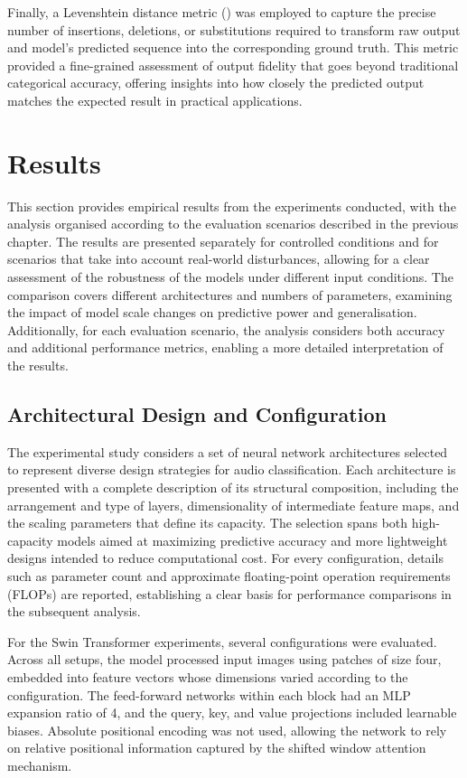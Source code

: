 \documentclass[a4paper,11pt,twoside]{report}
\theoremstyle{definition}
\begin{document}
Finally, a Levenshtein distance metric (\cite{levenshtein}) was employed to capture the precise number of insertions, deletions, or substitutions required to transform raw output and model's predicted sequence into the corresponding ground truth. This metric provided a fine-grained assessment of output fidelity that goes beyond traditional categorical accuracy, offering insights into how closely the predicted output matches the expected result in practical applications.


\chapter{Results}

This section provides empirical results from the experiments conducted, with the analysis organised according to the evaluation scenarios described in the previous chapter. The results are presented separately for controlled conditions and for scenarios that take into account real-world disturbances, allowing for a clear assessment of the robustness of the models under different input conditions. The comparison covers different architectures and numbers of parameters, examining the impact of model scale changes on predictive power and generalisation. Additionally, for each evaluation scenario, the analysis considers both accuracy and additional performance metrics, enabling a more detailed interpretation of the results.

\section{Architectural Design and Configuration}

The experimental study considers a set of neural network architectures selected to represent diverse design strategies for audio classification. Each architecture is presented with a complete description of its structural composition, including the arrangement and type of layers, dimensionality of intermediate feature maps, and the scaling parameters that define its capacity. The selection spans both high-capacity models aimed at maximizing predictive accuracy and more lightweight designs intended to reduce computational cost. For every configuration, details such as parameter count and approximate floating-point operation requirements (FLOPs) are reported, establishing a clear basis for performance comparisons in the subsequent analysis.

For the Swin Transformer experiments, several configurations were evaluated. Across all setups, the model processed input images using patches of size four, embedded into feature vectors whose dimensions varied according to the configuration. The feed-forward networks within each block had an MLP expansion ratio of 4, and the query, key, and value projections included learnable biases. Absolute positional encoding was not used, allowing the network to rely on relative positional information captured by the shifted window attention mechanism.
\end{document}
